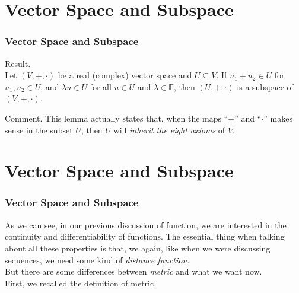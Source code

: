 \documentclass[12pt, t]{beamer}
\renewcommand{\emph}[1]{{\color{Turquoise3}\textsl{#1}}}
\begin{document}
\section{Vector Space and Subspace}
\begin{frame}
    \frametitle{Vector Space and Subspace}
    Result.\\
    \vspace{1em}
    \hspace{1em}
    Let $(V,+,\cdot)$ be a real (complex) vector space and $U\subseteq V$. If $u_1+u_2\in U$ for $u_1,u_2\in U$, and $\lambda u\in U$ for all $u\in U$ and $\lambda \in \mathbb{F}$, then $(U,+,\cdot)$ is a
    subspace of $(V,+,\cdot)$.\\
    \vspace{1em}
    \hspace{1em}

    Comment.
    This lemma actually states that, when the maps “$+$” and “$\cdot$” makes sense in the subset $U$, then $U$ will \emph{inherit the eight axioms} of $V$.

\end{frame}

\section{Vector Space and Subspace}
\begin{frame}
    \frametitle{Vector Space and Subspace}
    \hspace{1em}
    As we can see, in our previous discussion of function, we are interested in the continuity and differentiability of functions. The essential thing when talking about
    all these properties is that, we again, like when we were discussing sequences, we need some kind of \emph{distance function}.\\
    \hspace{1em}
    But there are some differences between \emph{metric} and what we want now.\\
    \hspace{1em}
    First, we recalled the definition of metric.\\

\end{frame}
\end{document}
